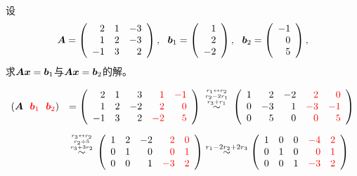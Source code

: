 \begin{li}
  设
  $$
  \boldsymbol{A} = \left(
    \begin{array}{rrr}
      2&1&-3\\
      1&2&-3\\
      -1&3&2
    \end{array}
  \right),
  ~~
  {\boldsymbol{b}}_1=\left(
    \begin{array}{r}
      1\\
      2\\
      -2
    \end{array}
  \right),
  ~~
  {\boldsymbol{b}}_2=\left(
    \begin{array}{r}
      -1\\
      0\\
      5
    \end{array}
  \right),
  $$
  求$\boldsymbol{A}{\boldsymbol{x}}={\boldsymbol{b}}_1$与$\boldsymbol{A}{\boldsymbol{x}}={\boldsymbol{b}}_2$的解。
\end{li}
\begin{jie}
  $$
  \begin{array}{rl}
    (\boldsymbol{A}~~\textcolor{red}{{\boldsymbol{b}}_1}~~\textcolor{red}{{\boldsymbol{b}}_2})
    &= \left(
      \begin{array}{rrrrr}
        2 & 1 & 3 &\textcolor{red}{ 1} & \textcolor{red}{-1}\\
        1 & 2 &-2 &\textcolor{red}{ 2} & \textcolor{red}{ 0}\\
        -1 & 3 & 2 &\textcolor{red}{-2} & \textcolor{red}{ 5}        
      \end{array}\right) \overset{{r_1\leftrightarrow r_2 \atop r_2-2r_1}\atop  r_3+r_1}{\sim}
                               \left(
                               \begin{array}{rrrrr}
                                 1 & 2 &-2 & \textcolor{red}{ 2} & \textcolor{red}{ 0}\\
                                 0 &-3 & 1 & \textcolor{red}{-3} & \textcolor{red}{-1}\\
                                 0 & 5 & 0 & \textcolor{red}{ 0} & \textcolor{red}{ 5}        
                               \end{array}
                                                        \right) \\[0.3in]
    & \overset{{r_3\leftrightarrow r_2 \atop r_2\div5}\atop  r_3+3r_2}{\sim}
      \left(
      \begin{array}{rrrrr}
        1 & 2 &-2 &\textcolor{red}{ 2} &  \textcolor{red}{0}\\
        0 & 1 & 0 &\textcolor{red}{ 0} &  \textcolor{red}{1}\\
        0 & 0 & 1 &\textcolor{red}{-3} &  \textcolor{red}{2}        
      \end{array}
                              \right)   \overset{r_1-2r_2+2r_3}{\sim}
                              \left(
                              \begin{array}{rrrrr}
                                1 & 0 & 0 & \textcolor{red}{-4} & \textcolor{red}{2}\\
                                0 & 1 & 0 & \textcolor{red}{0} &  \textcolor{red}{1}\\
                                0 & 0 & 1 & \textcolor{red}{-3} &  \textcolor{red}{2}        
                              \end{array}
                                                       \right) 
  \end{array}
  $$
\end{jie}




